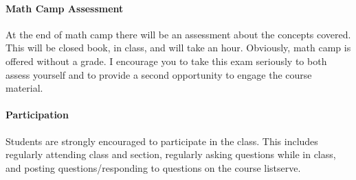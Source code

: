 \documentclass[11pt,letterpaper]{article}
\numberwithin{equation}{section}
\begin{document}
\paragraph{Math Camp Assessment} At the end of math camp there will be an assessment about the concepts covered.  This will be closed book, in class, and will take an hour.  Obviously, math camp is offered without a grade.  I encourage you to take this exam seriously to both assess yourself and to provide a second opportunity to engage the course material.




\paragraph{Participation} Students are strongly encouraged to participate in the class.  This includes regularly attending class and section, regularly asking questions while in class, and posting questions/responding to questions on the course listserve.

\end{document}
